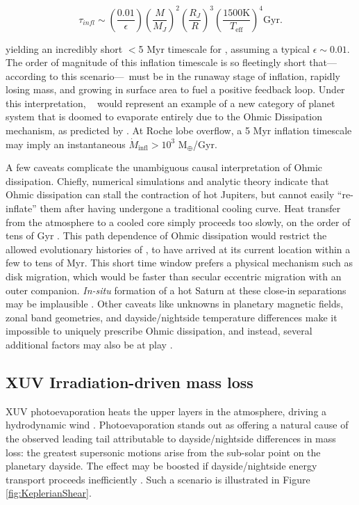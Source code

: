 \documentclass[twocolumn]{aastex631}
\newcommand{\hatpb}{\object{HAT-P-67 b}}
\begin{document}
\begin{equation}
    \tau_{\textit{infl}}\sim \left(\frac{0.01}{\epsilon} \right) \left(\frac{M}{M_{J}}\right)^2 \left(\frac{R_{J}}{R}\right)^3 \left(\frac{1500 \textrm{K}}{T_\mathrm{eff}}\right)^4 \textrm{Gyr}. \label{eqInflate}
\end{equation}


\noindent yielding an incredibly short $<$5 Myr timescale for \hatpb, assuming a typical $\epsilon\sim0.01$.  The order of magnitude of this inflation timescale is so fleetingly short that---according to this scenario---\hatpb~must be in the runaway stage of inflation, rapidly losing mass, and growing in surface area to fuel a positive feedback loop.  Under this interpretation, \hatpb~ would represent an example of a new category of planet system that is doomed to evaporate entirely due to the Ohmic Dissipation mechanism, as predicted by \citet{2011ApJ...738....1B}.  At Roche lobe overflow, a 5 Myr inflation timescale may imply an instantaneous $\dot{M}_\mathrm{infl}>10^{3}$ M$_\oplus$/Gyr.

A few caveats complicate the unambiguous causal interpretation of Ohmic dissipation.  Chiefly, numerical simulations \citep{2013ApJ...763...13W} and analytic theory \citep{2016ApJ...819..116G} indicate that Ohmic dissipation can stall the contraction of hot Jupiters, but cannot easily ``re-inflate'' them after having undergone a traditional cooling curve.  Heat transfer from the atmosphere to a cooled core simply proceeds too slowly, on the order of tens of Gyr \citep{2016ApJ...819..116G}.  This path dependence of Ohmic dissipation would restrict the allowed evolutionary histories of \hatpb, to have arrived at its current location within a few to tens of Myr.  This short time window prefers a physical mechanism such as disk migration, which would be faster than secular eccentric migration with an outer companion. \emph{In-situ} formation of a hot Saturn at these close-in separations may be implausible \citep{2018ARA&A..56..175D}.  Other caveats like unknowns in planetary magnetic fields, zonal band geometries, and dayside/nightside temperature differences make it impossible to uniquely prescribe Ohmic dissipation, and instead, several additional factors may also be at play \citep{2021A&A...645A..79S}.

\subsection{XUV Irradiation-driven mass loss}
XUV photoevaporation heats the upper layers in the atmosphere, driving a hydrodynamic wind \citep{2009ApJ...693...23M}.  Photoevaporation stands out as offering a natural cause of the observed leading tail attributable to dayside/nightside differences in mass loss: the greatest supersonic motions arise from the sub-solar point on the planetary dayside.  The effect may be boosted if dayside/nightside energy transport proceeds inefficiently \citep{2009ApJ...693...23M}.  Such a scenario is illustrated in Figure \ref{fig:KeplerianShear}.
\end{document}
